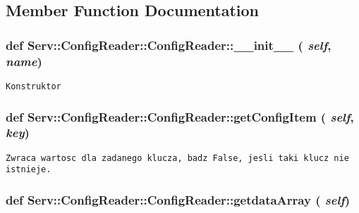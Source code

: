 \subsection{Member Function Documentation}
\hypertarget{class_serv_1_1_config_reader_1_1_config_reader_79fcc0800606aaab1c5b4b0f2910b821}{
\subsubsection[{\_\-\_\-init\_\-\_\-}]{\setlength{\rightskip}{0pt plus 5cm}def Serv::ConfigReader::ConfigReader::\_\-\_\-init\_\-\_\- ( {\em self}, \/   {\em name})}}
\label{class_serv_1_1_config_reader_1_1_config_reader_79fcc0800606aaab1c5b4b0f2910b821}




\footnotesize\begin{verbatim}Konstruktor\end{verbatim}
\normalsize
 \hypertarget{class_serv_1_1_config_reader_1_1_config_reader_9679117d87cde62fd4243670089a11cc}{
\subsubsection[{getConfigItem}]{\setlength{\rightskip}{0pt plus 5cm}def Serv::ConfigReader::ConfigReader::getConfigItem ( {\em self}, \/   {\em key})}}
\label{class_serv_1_1_config_reader_1_1_config_reader_9679117d87cde62fd4243670089a11cc}




\footnotesize\begin{verbatim}Zwraca wartosc dla zadanego klucza, badz False, jesli taki klucz nie istnieje.\end{verbatim}
\normalsize
 \hypertarget{class_serv_1_1_config_reader_1_1_config_reader_6a032fedc46e0b5557d1124aeb5fc996}{
\subsubsection[{getdataArray}]{\setlength{\rightskip}{0pt plus 5cm}def Serv::ConfigReader::ConfigReader::getdataArray ( {\em self})}}
\label{class_serv_1_1_config_reader_1_1_config_reader_6a032fedc46e0b5557d1124aeb5fc996}




